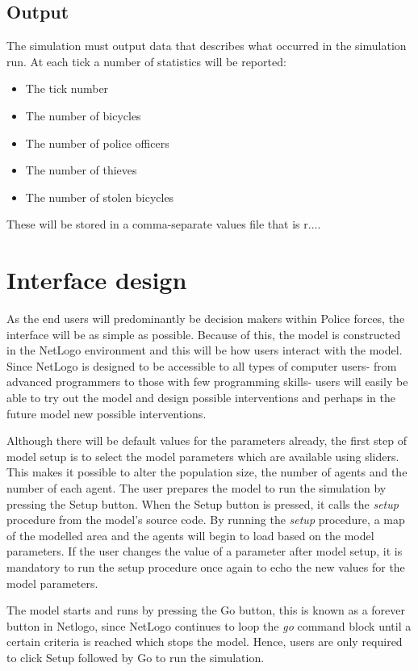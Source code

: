 \documentclass[11pt]{informatics-report}
\begin{document}
\subsection{Output}
The simulation must output data that describes what occurred in the simulation run. At each tick a number of statistics will be reported:
\begin{itemize}
\item The tick number
\item The number of bicycles
\item The number of police officers
\item The number of thieves
\item The number of stolen bicycles
\end{itemize}
These will be stored in a comma-separate values file that is r....
\section{Interface design}
As the end users will predominantly be decision makers within Police forces, the interface will be as simple as possible. Because of this, the model is constructed in the NetLogo environment and this will be how users interact with the model. Since NetLogo is designed to be accessible to all types of computer users- from advanced programmers to those with few programming skills- users will easily be able to try out the model and design possible interventions and perhaps in the future model new possible interventions. \par

Although there will be default values for the parameters already, the first step of model setup is to select the model parameters which are available using sliders. This makes it possible to alter the population size, the number of agents and the number of each agent. The user prepares the model to run the simulation by pressing the Setup button. When the Setup button is pressed, it calls the \textit{setup} procedure from the model's source code. By running the \textit{setup} procedure, a map of the modelled area and the agents will begin to load based on the model parameters. If the user changes the value of a parameter after model setup, it is mandatory to run the setup procedure once again to echo the new values for the model parameters. \par

The model starts and runs by pressing the Go button, this is known as a forever button in Netlogo, since NetLogo continues to loop the \textit{go} command block until a certain criteria is reached which stops the model. Hence, users are only required to click Setup followed by Go to run the simulation.  \par
\end{document}
